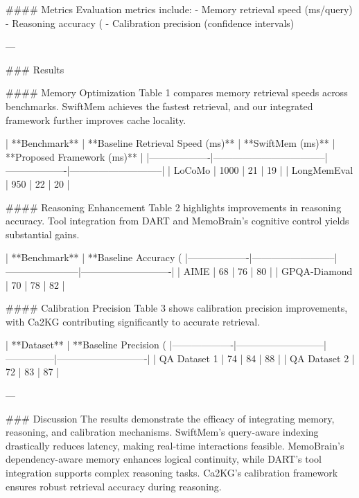 #### Metrics
Evaluation metrics include:
- Memory retrieval speed (ms/query)
- Reasoning accuracy (%
- Calibration precision (confidence intervals)

---

### Results

#### Memory Optimization
Table 1 compares memory retrieval speeds across benchmarks. SwiftMem achieves the fastest retrieval, and our integrated framework further improves cache locality.

| **Benchmark**     | **Baseline Retrieval Speed (ms)** | **SwiftMem (ms)** | **Proposed Framework (ms)** |
|-------------------|-----------------------------------|-------------------|-----------------------------|
| LoCoMo            | 1000                             | 21                | 19                          |
| LongMemEval       | 950                              | 22                | 20                          |

#### Reasoning Enhancement
Table 2 highlights improvements in reasoning accuracy. Tool integration from DART and MemoBrain's cognitive control yields substantial gains.

| **Benchmark**     | **Baseline Accuracy (%
|-------------------|--------------------------|-----------------------|----------------------------|
| AIME              | 68                       | 76                    | 80                         |
| GPQA-Diamond      | 70                       | 78                    | 82                         |

#### Calibration Precision
Table 3 shows calibration precision improvements, with Ca2KG contributing significantly to accurate retrieval.

| **Dataset**       | **Baseline Precision (%
|-------------------|---------------------------|---------------|----------------------------|
| QA Dataset 1      | 74                        | 84            | 88                         |
| QA Dataset 2      | 72                        | 83            | 87                         |

---

### Discussion
The results demonstrate the efficacy of integrating memory, reasoning, and calibration mechanisms. SwiftMem's query-aware indexing drastically reduces latency, making real-time interactions feasible. MemoBrain's dependency-aware memory enhances logical continuity, while DART's tool integration supports complex reasoning tasks. Ca2KG's calibration framework ensures robust retrieval accuracy during reasoning.

